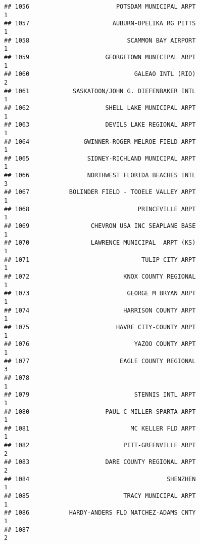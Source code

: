 \documentclass[
]{article}
\begin{document}
\begin{verbatim}
## 1056                        POTSDAM MUNICIPAL ARPT                           1
## 1057                       AUBURN-OPELIKA RG PITTS                           1
## 1058                           SCAMMON BAY AIRPORT                           1
## 1059                     GEORGETOWN MUNICIPAL ARPT                           1
## 1060                             GALEAO INTL (RIO)                           2
## 1061            SASKATOON/JOHN G. DIEFENBAKER INTL                           1
## 1062                     SHELL LAKE MUNICIPAL ARPT                           1
## 1063                     DEVILS LAKE REGIONAL ARPT                           1
## 1064               GWINNER-ROGER MELROE FIELD ARPT                           1
## 1065                SIDNEY-RICHLAND MUNICIPAL ARPT                           1
## 1066                NORTHWEST FLORIDA BEACHES INTL                           3
## 1067           BOLINDER FIELD - TOOELE VALLEY ARPT                           1
## 1068                              PRINCEVILLE ARPT                           1
## 1069                 CHEVRON USA INC SEAPLANE BASE                           1
## 1070                 LAWRENCE MUNICIPAL  ARPT (KS)                           1
## 1071                               TULIP CITY ARPT                           1
## 1072                          KNOX COUNTY REGIONAL                           1
## 1073                           GEORGE M BRYAN ARPT                           1
## 1074                          HARRISON COUNTY ARPT                           1
## 1075                        HAVRE CITY-COUNTY ARPT                           1
## 1076                             YAZOO COUNTY ARPT                           1
## 1077                         EAGLE COUNTY REGIONAL                           3
## 1078                                                                         1
## 1079                             STENNIS INTL ARPT                           1
## 1080                     PAUL C MILLER-SPARTA ARPT                           1
## 1081                            MC KELLER FLD ARPT                           1
## 1082                          PITT-GREENVILLE ARPT                           2
## 1083                     DARE COUNTY REGIONAL ARPT                           2
## 1084                                      SHENZHEN                           1
## 1085                          TRACY MUNICIPAL ARPT                           1
## 1086           HARDY-ANDERS FLD NATCHEZ-ADAMS CNTY                           1
## 1087                                                                         2

\end{verbatim}
\end{document}
